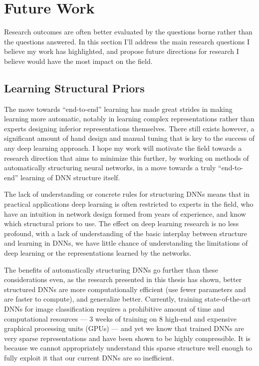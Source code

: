 \documentclass[thesis]{subfiles}
\begin{document}

\chapter{Future Work}  %
\label{futurework}


Research outcomes are often better evaluated by the questions borne rather than the questions answered. In this section I'll address the main research questions I believe my work has highlighted, and propose future directions for research I believe would have the most impact on the field.

\section{Learning Structural Priors}
The move towards ``end-to-end'' learning has made great strides in making learning more automatic, notably in learning complex representations rather than experts designing inferior representations themselves. There still exists however, a significant amount of hand design and manual tuning that is key to the success of any deep learning approach. I hope my work will motivate the field towards a research direction that aims to minimize this further, by working on methods of automatically structuring neural networks, in a move towards a truly ``end-to-end'' learning of DNN structure itself.

The lack of understanding or concrete rules for structuring DNNs means that in practical applications deep learning is often restricted to experts in the field, who have an intuition in network design formed from years of experience, and know which structural priors to use. The effect on deep learning research is no less profound, with a lack of understanding of the basic interplay between structure and learning in DNNs, we have little chance of understanding the limitations of deep learning or the representations learned by the networks. 

The benefits of automatically structuring DNNs go further than these considerations even, as the research presented in this thesis has shown, better structured DNNs are more computationally efficient (use fewer parameters and are faster to compute), and generalize better. Currently, training state-of-the-art DNNs for image classification requires a prohibitive amount of time and computational resources --- 3 weeks of training on 8 high-end and expensive graphical processing units (GPUs) --- and yet we know that trained DNNs are very sparse representations and have been shown to be highly compressible. It is because we cannot appropriately understand this sparse structure well enough to fully exploit it that our current DNNs are so inefficient.
\end{document}
